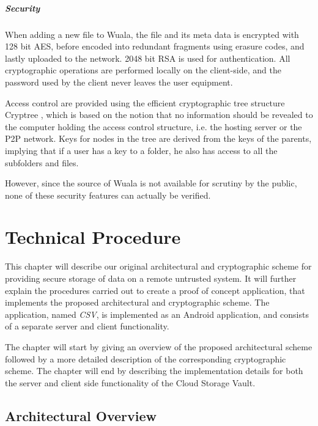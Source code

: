 \documentclass[pdftex,english,10pt,b5paper,twoside]{book}
\begin{document}
\paragraph{Security} When adding a new file to Wuala, the file and its meta
data is encrypted with 128 bit \ac{AES}, before encoded into redundant
fragments using erasure codes, and lastly uploaded to the network. 2048 bit
\ac{RSA} is used for authentication. All cryptographic operations are performed
locally on the client-side, and the password used by the client never leaves
the user equipment.

Access control are provided using the efficient cryptographic tree structure
Cryptree \cite{cryptree, wuala}, which is based on the notion that no
information should be revealed to the computer holding the access control
structure, i.e. the hosting server or the \ac{P2P} network. Keys for nodes in
the tree are derived from the keys of the parents, implying that if a user has
a key to a folder, he also has access to all the subfolders and files.

However, since the source of Wuala is not available for scrutiny by the public, none of
these security features can actually be verified.



\chapter{Technical Procedure}
\label{ch:technical}


This chapter will describe our original architectural and cryptographic
scheme for providing secure storage of data on a remote untrusted system. It will
further explain the procedures carried out to create a proof of concept
application, that implements the proposed architectural and cryptographic
scheme. The application, named \emph{\ac{CSV}}, is implemented as an
Android application, and consists of a separate server and client functionality.

The chapter will start by giving an overview of the proposed architectural
scheme followed by a more detailed description of the corresponding
cryptographic scheme. The chapter will end by describing the implementation
details for both the server and client side functionality of the Cloud Storage Vault.

\section{Architectural Overview}
\label{chap:AS}
\end{document}
